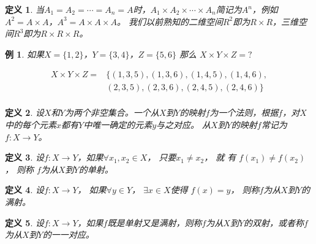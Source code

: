 \documentclass{book}[oneside]
\newtheorem{Def}{定义}[chapter]
\newtheorem*{Example}{例}
\begin{document}
\begin{CJK*}{UTF8}{gbsn}
\begin{Def}
当$A_1=A_2=\cdots=A_n=A$时，$A_1 \times A_2\times \cdots \times A_n$简记为$A^n$，例如$A^2=A\times A$，$A^3=A\times A\times A$。
我们以前熟知的二维空间$R^2$即为$R\times R$，三维空间$R^3$即为$R\times R\times R$。

  \end{Def}
  \begin{Example}

        如果$X=\{1,2\}$，$Y=\{3,4\}$，$Z=\{5,6\}$ 那么 $X \times Y \times Z = ?$
    
     \begin{equation*}
       \begin{split}
        X \times Y \times Z =& \{ (1,3, 5), (1,3, 6), (1, 4, 5), (1, 4, 6), \\
 &(2, 3, 5), (2, 3, 6), (2, 4, 5), (2, 4, 6) \}\\
       \end{split}
     \end{equation*}

  \end{Example}

  \begin{Def}
    设$X$和$Y$为两个非空集合。一个从$X$到$Y$的映射$f$为一个法则，根据$f$，对$X$中的每个元素$x$都有$Y$中唯一确定的元素$y$与之对应。
    从$X$到$Y$的映射$f$常记为$f:X\to Y$。
  \end{Def}
    \begin{Def}
    设$f:X\to Y$，如果$\forall x_1, x_2 \in X$， 只要$x_1 \neq x_2$，  就 有 $f(x_1) \neq f(x_2)$，   则称 $f$为从$X$到$Y$的单射。
  \end{Def}
  \begin{Def}
    设$f:X\to Y$， 如果$\forall y \in Y$， $\exists x \in X$使得 $f(x) = y$， 则称$f$为从$X$到$Y$的满射。
  \end{Def}
  \begin{Def}
    设$f:X\to Y$，如果$f$既是单射又是满射，则称$f$为从$X$到$Y$的双射，或者称$f$为从$X$到$Y$的一一对应。
  \end{Def}


\end{CJK*}
\end{document}
